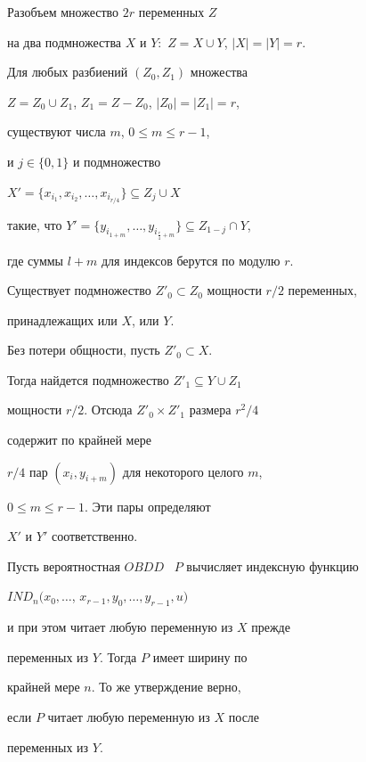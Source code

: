 \begin{lem}


Разобъем множество $2r$ переменных $Z$


на два подмножества $X$ и $Y{:}$ $Z=X\cup Y$, $|X|=|Y|=r$.


Для любых разбиений $(Z_0, Z_1)$ множества


$Z=Z_0\cup Z_1$, $Z_1=Z-Z_0$, $|Z_0|=|Z_1|=r$,


существуют числа $m$, $0\le m\le r-1$,


и $j\in\{0,1\}$ и подмножество


$X'=\{x_{i_1},x_{i_2},\dotsc,x_{i_{r/4}}\}\subseteq Z_j\cup X$


такие, что $Y'=\{y_{i_{1+m}},\dotsc,y_{i_{\frac{r}{4}+m}}\}


\subseteq Z_{1-j}\cap Y$,


где суммы $l+m$ для индексов берутся по модулю $r$.


\end{lem}








\begin{pf}


Существует подмножество $Z'_0\subset Z_0$ мощности $r/2$ переменных,


принадлежащих или $X$, или $Y$.


Без потери общности, пусть $Z'_0\subset X$.


Тогда найдется подмножество $Z'_1\subseteq Y\cup Z_1$


мощности $r/2$. Отсюда $Z'_0\times Z'_1$ размера $r^2/4$


содержит по крайней мере


$r/4$ пар $(x_i,y_{i+m})$ для некоторого целого $m$,


$0\le m\le r-1$. Эти пары определяют


$X'$ и $Y'$ соответственно.


\end{pf}








\begin{thm}


Пусть вероятностная $OBDD$ \ $P$ вычисляет индексную функцию


$IND_n(x_0, \dotsc$, $x_{r-1}, y_0, \dotsc, y_{r-1}, u)$




и при этом читает любую переменную из $X$ прежде


переменных из $Y$. Тогда $P$ имеет ширину по


крайней мере $n$. То же утверждение верно,


если $P$ читает любую переменную из $X$ после


переменных из $Y$.


\end{thm}








